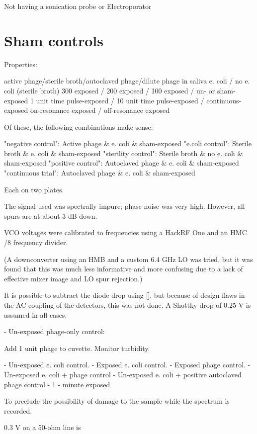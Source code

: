 \documentclass[paper.tex]{subfiles}
\begin{document}
Not having a sonication probe or Electroporator

\section{Sham controls}






Properties:

active phage/sterile broth/autoclaved phage/dilute phage in saliva
e. coli / no e. coli (sterile broth)
300 exposed / 200 exposed / 100 exposed / un- or sham-exposed
1 unit time pulse-exposed / 10 unit time pulse-exposed / continuous-exposed
on-resonance exposed / off-resonance exposed


Of these, the following combinations make sense:

"negative control": Active phage \& e. coli \& sham-exposed
"e.coli control": Sterile broth \& e. coli \& sham-exposed
"sterility control": Sterile broth \& no e. coli \& sham-exposed
"positive control": Autoclaved phage \& e. coli \& sham-exposed
"continuous trial": Autoclaved phage \& e. coli \& sham-exposed

Each on two plates.


The signal used was spectrally impure; phase noise was very high. However, all spurs are at about 3 dB down.

VCO voltages were calibrated to frequencies using a HackRF One and an HMC /8 frequency divider.

(A downconverter using an HMB and a custom 6.4 GHz LO was tried, but it was found that this was much less informative and more confusing
due to a lack of effective mixer image and LO spur rejection.)

It is possible to subtract the diode drop using [], but because of design flaws in the AC coupling of the detectors, this was not done.
A Shottky drop of 0.25 V is assumed in all cases.

- Un-exposed phage-only control:

Add 1 unit phage to cuvette. Monitor turbidity.

- Un-exposed e. coli control.
- Exposed e. coli control.
- Exposed phage control.
- Un-exposed e. coli + phage control
- Un-exposed e. coli + positive autoclaved phage control
- 1 - minute exposed


To preclude the possibility of damage to the sample while the spectrum is recorded.

0.3 V on a 50-ohm line is
\end{document}
